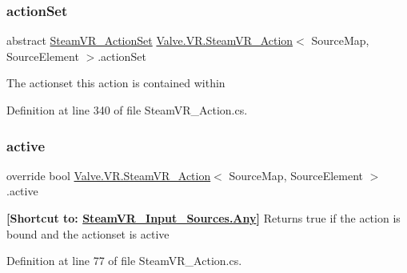 \subsubsection{\texorpdfstring{actionSet}{actionSet}\hspace{0.1cm}{\footnotesize\ttfamily [2/2]}}
{\footnotesize\ttfamily abstract \mbox{\hyperlink{class_valve_1_1_v_r_1_1_steam_v_r___action_set}{Steam\+V\+R\+\_\+\+Action\+Set}} \mbox{\hyperlink{class_valve_1_1_v_r_1_1_steam_v_r___action}{Valve.\+V\+R.\+Steam\+V\+R\+\_\+\+Action}}$<$ Source\+Map, Source\+Element $>$.action\+Set\hspace{0.3cm}{\ttfamily [get]}}



The actionset this action is contained within 



Definition at line 340 of file Steam\+V\+R\+\_\+\+Action.\+cs.

\mbox{\label{class_valve_1_1_v_r_1_1_steam_v_r___action_a4737fe5382afbd927eb06bdcadbbbbf4}} 
\subsubsection{\texorpdfstring{active}{active}\hspace{0.1cm}{\footnotesize\ttfamily [1/2]}}
{\footnotesize\ttfamily override bool \mbox{\hyperlink{class_valve_1_1_v_r_1_1_steam_v_r___action}{Valve.\+V\+R.\+Steam\+V\+R\+\_\+\+Action}}$<$ Source\+Map, Source\+Element $>$.active\hspace{0.3cm}{\ttfamily [get]}}



{\bfseries{\mbox{[}Shortcut to\+: \mbox{\hyperlink{namespace_valve_1_1_v_r_a82e5bf501cc3aa155444ee3f0662853faed36a1ef76a59ee3f15180e0441188ad}{Steam\+V\+R\+\_\+\+Input\+\_\+\+Sources.\+Any}}\mbox{]}}} Returns true if the action is bound and the actionset is active 



Definition at line 77 of file Steam\+V\+R\+\_\+\+Action.\+cs.

\mbox{\label{class_valve_1_1_v_r_1_1_steam_v_r___action_a0fd56f7ca6074a8320738f50c8d43844}} 
